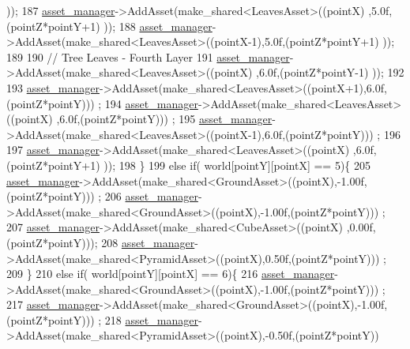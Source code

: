 \begin{DoxyCode}
      ));
187             \hyperlink{classGameWorld_aec5c0bca4fb5a41e4aac2dce2871266d}{asset\_manager}->AddAsset(make\_shared<LeavesAsset>((pointX)  ,5.0f,(pointZ*pointY+1)
      ));
188             \hyperlink{classGameWorld_aec5c0bca4fb5a41e4aac2dce2871266d}{asset\_manager}->AddAsset(make\_shared<LeavesAsset>((pointX-1),5.0f,(pointZ*pointY+1)
      ));
189 
190             \textcolor{comment}{// Tree Leaves - Fourth Layer}
191             \hyperlink{classGameWorld_aec5c0bca4fb5a41e4aac2dce2871266d}{asset\_manager}->AddAsset(make\_shared<LeavesAsset>((pointX)  ,6.0f,(pointZ*pointY-1)
      ));
192 
193             \hyperlink{classGameWorld_aec5c0bca4fb5a41e4aac2dce2871266d}{asset\_manager}->AddAsset(make\_shared<LeavesAsset>((pointX+1),6.0f,(pointZ*pointY)))
      ;
194             \hyperlink{classGameWorld_aec5c0bca4fb5a41e4aac2dce2871266d}{asset\_manager}->AddAsset(make\_shared<LeavesAsset>((pointX)  ,6.0f,(pointZ*pointY)))
      ;
195             \hyperlink{classGameWorld_aec5c0bca4fb5a41e4aac2dce2871266d}{asset\_manager}->AddAsset(make\_shared<LeavesAsset>((pointX-1),6.0f,(pointZ*pointY)))
      ;
196 
197             \hyperlink{classGameWorld_aec5c0bca4fb5a41e4aac2dce2871266d}{asset\_manager}->AddAsset(make\_shared<LeavesAsset>((pointX)  ,6.0f,(pointZ*pointY+1)
      ));
198    \}
199     \textcolor{keywordflow}{else} \textcolor{keywordflow}{if}( world[pointY][pointX] == 5)\{
205             \hyperlink{classGameWorld_aec5c0bca4fb5a41e4aac2dce2871266d}{asset\_manager}->AddAsset(make\_shared<GroundAsset>((pointX),-1.00f,(pointZ*pointY)))
      ;
206             \hyperlink{classGameWorld_aec5c0bca4fb5a41e4aac2dce2871266d}{asset\_manager}->AddAsset(make\_shared<GroundAsset>((pointX),-1.00f,(pointZ*pointY)))
      ;
207             \hyperlink{classGameWorld_aec5c0bca4fb5a41e4aac2dce2871266d}{asset\_manager}->AddAsset(make\_shared<CubeAsset>((pointX)  ,0.00f,(pointZ*pointY)));
208             \hyperlink{classGameWorld_aec5c0bca4fb5a41e4aac2dce2871266d}{asset\_manager}->AddAsset(make\_shared<PyramidAsset>((pointX),0.50f,(pointZ*pointY)))
      ;
209    \}
210     \textcolor{keywordflow}{else} \textcolor{keywordflow}{if}( world[pointY][pointX] == 6)\{
216             \hyperlink{classGameWorld_aec5c0bca4fb5a41e4aac2dce2871266d}{asset\_manager}->AddAsset(make\_shared<GroundAsset>((pointX),-1.00f,(pointZ*pointY)))
      ;
217             \hyperlink{classGameWorld_aec5c0bca4fb5a41e4aac2dce2871266d}{asset\_manager}->AddAsset(make\_shared<GroundAsset>((pointX),-1.00f,(pointZ*pointY)))
      ;
218             \hyperlink{classGameWorld_aec5c0bca4fb5a41e4aac2dce2871266d}{asset\_manager}->AddAsset(make\_shared<PyramidAsset>((pointX),-0.50f,(pointZ*pointY))

\end{DoxyCode}
